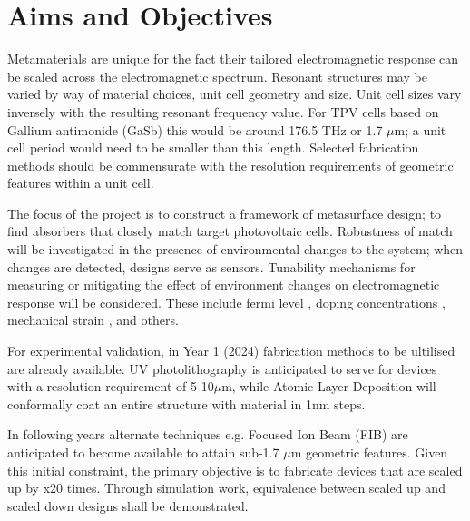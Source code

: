 


\section{Aims and Objectives} \label{section-with-figure}

Metamaterials are unique for the fact their tailored electromagnetic response can be scaled across the electromagnetic spectrum. Resonant structures may be varied by way of material choices, unit cell geometry and size. Unit cell sizes vary inversely with the resulting resonant frequency value. 
For TPV cells based on Gallium antimonide (GaSb) this would be around 176.5 THz or 1.7 $\mu$m; a unit cell period would need to be smaller than this length. Selected fabrication methods should be commensurate with the resolution requirements of geometric features within a unit cell. 

The focus of the project is to construct a framework of metasurface design; to find absorbers that closely match target photovoltaic cells. Robustness of match will be investigated in the presence of environmental changes to the system; when changes are detected, designs serve as sensors. Tunability mechanisms for measuring or mitigating the effect of environment changes on electromagnetic response will be considered. These include fermi level \cite{Nie2024}, doping concentrations \cite{MoS2}, mechanical strain \cite{Amir2023}, and others.

For experimental validation, in Year 1 (2024) fabrication methods to be ultilised are already available. UV photolithography is anticipated to serve for devices with a resolution requirement of 5-10$\mu$m, while Atomic Layer Deposition will conformally coat an entire structure with material in 1nm steps. 

In following years alternate techniques e.g. Focused Ion Beam (FIB) are anticipated to become available to attain sub-1.7 $\mu$m geometric features. Given this initial constraint, the primary objective is to fabricate devices that are scaled up by x20 times. Through simulation work, equivalence between scaled up and scaled down designs shall be demonstrated. 

